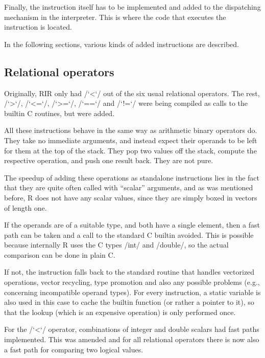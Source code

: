 Finally, the instruction itself has to be implemented and added to the dispatching mechanism in the interpreter. This is where the code that executes the instruction is located.

In the following sections, various kinds of added instructions are described.


\subsection{Relational operators}

Originally, RIR only had \rinline/`<`/ out of the six usual relational operators. The rest, \rinline/`>`/, \rinline/`<=`/, \rinline/`>=`/, \rinline/`==`/ and \rinline/`!=`/ were being compiled as calls to the builtin C routines, but were added.

All these instructions behave in the same way as arithmetic binary operators do. They take no immediate arguments, and instead expect their operands to be left for them at the top of the stack. They pop two values off the stack, compute the respective operation, and push one result back. They are not pure\todo[why].


The speedup of adding these operations as standalone instructions lies in the fact that they are quite often called with ``scalar'' arguments, and as was mentioned before, R does not have any scalar values, since they are simply boxed in vectors of length one.

If the operands are of a suitable type, and both have a single element, then a fast path can be taken and a call to the standard C builtin avoided. This is possible because internally R uses the C types \cinline/int/ and \cinline/double/, so the actual comparison can be done in plain C.

If not, the instruction falls back to the standard routine that handles vectorized operations, vector recycling, type promotion and also any possible problems (e.g., concerning incompatible operand types). For every instruction, a static variable is also used in this case to cache the builtin function (or rather a pointer to it), so that the lookup (which is an expensive operation) is only performed once.

For the \rinline/`<`/ operator, combinations of integer and double scalars had fast paths implemented. This was amended and for all relational operators there is now also a fast path for comparing two logical values.

